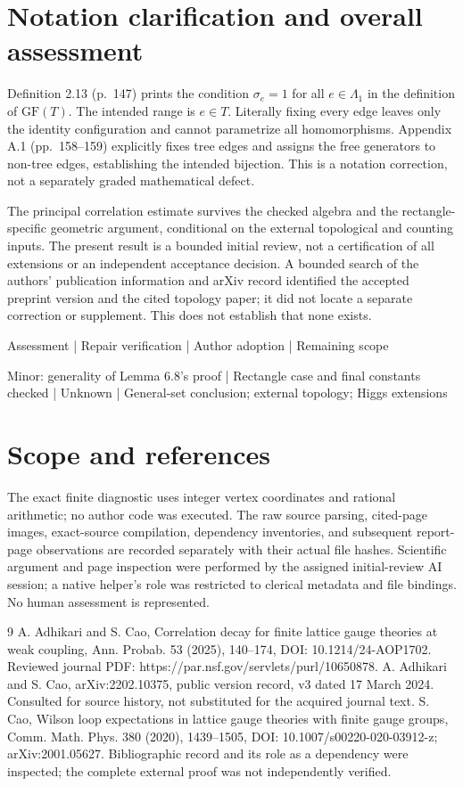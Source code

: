 \documentclass[10pt]{article}
\begin{document}
\section*{Notation clarification and overall assessment}
Definition 2.13 (p. 147) prints the condition \(\sigma_e=1\) for all \(e\in\Lambda_1\) in the definition of \(\mathrm{GF}(T)\). The intended range is \(e\in T\). Literally fixing every edge leaves only the identity configuration and cannot parametrize all homomorphisms. Appendix A.1 (pp. 158–159) explicitly fixes tree edges and assigns the free generators to non-tree edges, establishing the intended bijection. This is a notation correction, not a separately graded mathematical defect.\par
The principal correlation estimate survives the checked algebra and the rectangle-specific geometric argument, conditional on the external topological and counting inputs. The present result is a bounded initial review, not a certification of all extensions or an independent acceptance decision. A bounded search of the authors’ publication information and arXiv record identified the accepted preprint version and the cited topology paper; it did not locate a separate correction or supplement. This does not establish that none exists.\par
Assessment | Repair verification | Author adoption | Remaining scope\par
Minor: generality of Lemma 6.8’s proof | Rectangle case and final constants checked | Unknown | General-set conclusion; external topology; Higgs extensions\par
\section*{Scope and references}
The exact finite diagnostic uses integer vertex coordinates and rational arithmetic; no author code was executed. The raw source parsing, cited-page images, exact-source compilation, dependency inventories, and subsequent report-page observations are recorded separately with their actual file hashes. Scientific argument and page inspection were performed by the assigned initial-review AI session; a native helper’s role was restricted to clerical metadata and file bindings. No human assessment is represented.\par
9 A. Adhikari and S. Cao, Correlation decay for finite lattice gauge theories at weak coupling, Ann. Probab. 53 (2025), 140–174, DOI: 10.1214/24-AOP1702. Reviewed journal PDF: https://par.nsf.gov/servlets/purl/10650878. A. Adhikari and S. Cao, arXiv:2202.10375, public version record, v3 dated 17 March 2024. Consulted for source history, not substituted for the acquired journal text. S. Cao, Wilson loop expectations in lattice gauge theories with finite gauge groups, Comm. Math. Phys. 380 (2020), 1439–1505, DOI: 10.1007/s00220-020-03912-z; arXiv:2001.05627. Bibliographic record and its role as a dependency were inspected; the complete external proof was not independently verified.\par
\end{document}
